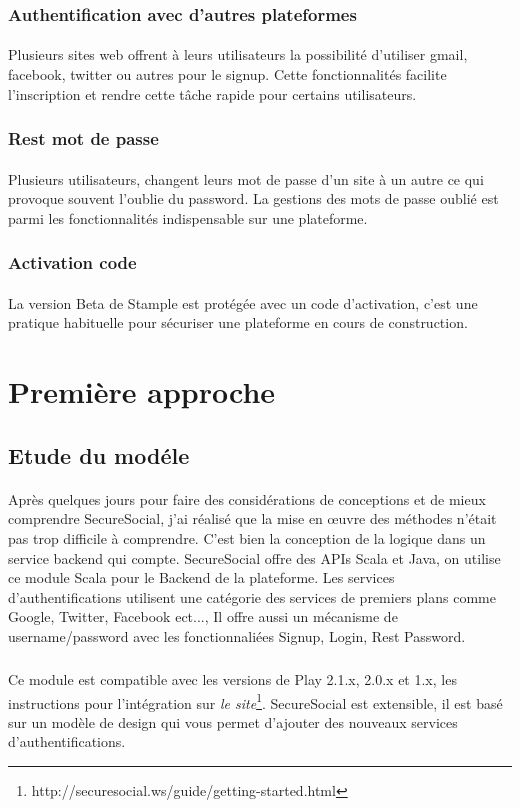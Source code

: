 \subsubsection{Authentification avec d'autres plateformes}
\paragraph{}
Plusieurs sites web offrent à leurs utilisateurs la possibilité d'utiliser gmail, facebook, twitter ou autres pour le signup.
Cette fonctionnalités facilite l'inscription et rendre cette tâche rapide pour certains utilisateurs.
\subsubsection{Rest mot de passe}
\paragraph{}
Plusieurs utilisateurs, changent leurs mot de passe d'un site à un autre ce qui provoque souvent l'oublie du password.
La gestions des mots de passe oublié est parmi les fonctionnalités indispensable sur une plateforme.
\subsubsection{Activation code}
\paragraph{}
La version Beta de Stample est protégée avec un code d'activation, c'est une pratique habituelle pour sécuriser une plateforme en cours de construction.
\section{Première approche}
\subsection{Etude du modéle}
\paragraph{}
Après quelques jours pour faire des considérations de conceptions et de mieux comprendre SecureSocial, j'ai réalisé que la mise en œuvre des méthodes n'était pas trop difficile à comprendre. C'est bien la conception de la logique dans un service backend qui compte. 
SecureSocial offre des APIs Scala et Java, on utilise ce module Scala pour le Backend de la plateforme.
Les services d'authentifications utilisent une catégorie des services de premiers plans comme Google, Twitter, Facebook ect..., Il offre aussi un mécanisme de username/password avec les fonctionnaliées Signup, Login, Rest Password.
\subparagraph{}
Ce module est compatible avec les versions de Play 2.1.x, 2.0.x et 1.x, les instructions pour l'intégration sur \textit{le site}\footnote{http://securesocial.ws/guide/getting-started.html}.
SecureSocial est extensible, il est basé sur un modèle de design qui vous permet d'ajouter des nouveaux services d'authentifications.

